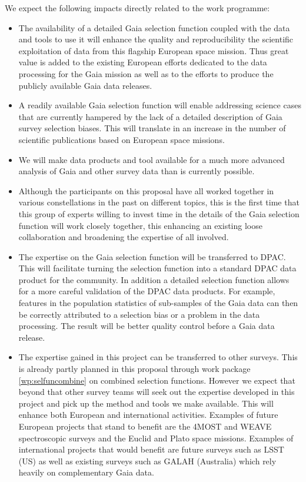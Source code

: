 We expect the following impacts directly related to the work programme:
\begin{itemize}
    \item The availability of a detailed Gaia selection function coupled with the data and tools to use it will enhance the quality and reproducibility the scientific exploitation of data from this flagship European space mission. Thus great value is added to the existing European efforts dedicated to the data processing for the Gaia mission as well as to the efforts to produce the publicly available Gaia data releases.
    \item A readily available Gaia selection function will enable addressing science cases that are currently hampered by the lack of a detailed description of Gaia survey selection biases. This will translate in an increase in the number of scientific publications based on European space missions.
    \item We will make data products and tool available for a much more advanced analysis of Gaia and other survey data than is currently possible.
    \item Although the participants on this proposal have all worked together in various constellations in the past on different topics, this is the first time that this group of experts willing to invest time in the details of the Gaia selection function will work closely together, this enhancing an existing loose collaboration and broadening the expertise of all involved.
    \item The expertise on the Gaia selection function will be transferred to DPAC. This will facilitate turning the selection function into a standard DPAC data product for the community. In addition a detailed selection function allows for a more careful validation of the DPAC data products. For example, features in the population statistics of sub-samples of the Gaia data can then be correctly attributed to a selection bias or a problem in the data processing. The result will be better quality control before a Gaia data release.
    \item The expertise gained in this project can be transferred to other surveys. This is already partly planned in this proposal through work package \ref{wp:selfuncombine} on combined selection functions. However we expect that beyond that other survey teams will seek out the expertise developed in this project and  pick up the method and tools we make available. This will enhance both European and international activities. Examples of future European projects that stand to benefit are the 4MOST and WEAVE spectroscopic surveys and the Euclid and Plato space missions. Examples of international projects that would benefit are future surveys such as LSST (US) as well as existing surveys such as GALAH (Australia) which rely heavily on complementary Gaia data.
\end{itemize}

